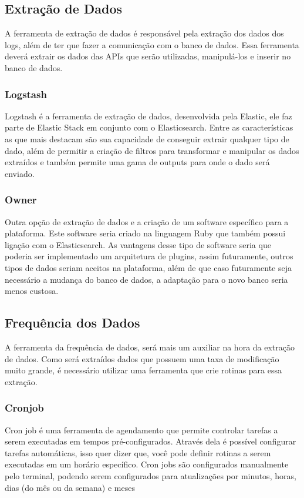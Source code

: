 \subsection{Extração de Dados}
A ferramenta de extração de dados é responsável pela extração dos dados dos logs, além de ter que fazer a comunicação com o banco de dados. Essa ferramenta deverá extrair os dados das APIs que serão utilizadas, manipulá-los e inserir no banco de dados.
\subsubsection*{Logstash}
Logstash é a ferramenta de extração de dados, desenvolvida pela Elastic, ele faz parte de Elastic Stack em conjunto com o Elasticsearch. Entre as características as que mais destacam são sua capacidade de conseguir extrair qualquer tipo de dado, além de permitir a criação de filtros para transformar e manipular os dados extraídos e também permite uma gama de outputs para onde o dado será enviado\cite{logstash}.
\subsubsection*{Owner}
Outra opção de extração de dados e a criação de um software específico para a plataforma. Este software seria criado na linguagem Ruby que também possui ligação com o Elasticsearch. As vantagens desse tipo de software seria que poderia ser implementado um arquitetura de plugins, assim futuramente, outros tipos de dados seriam aceitos na plataforma, além de que caso futuramente seja necessário a mudança do banco de dados, a adaptação para o novo banco seria menos custosa.
\subsection{Frequência dos Dados}
A ferramenta da frequência de dados, será mais um auxiliar na hora da extração de dados. Como será extraídos dados que possuem uma taxa de modificação muito grande, é necessário utilizar uma ferramenta que crie rotinas para essa extração.
\subsubsection*{Cronjob}
Cron job é uma ferramenta de agendamento que permite controlar tarefas a serem executadas em tempos pré-configurados. Através dela é possível configurar tarefas automáticas, isso quer dizer que, você pode definir rotinas a serem executadas em um horário específico. Cron jobs são configurados manualmente pelo terminal, podendo serem configurados para atualizações por minutos, horas, dias (do mês ou da semana) e meses

